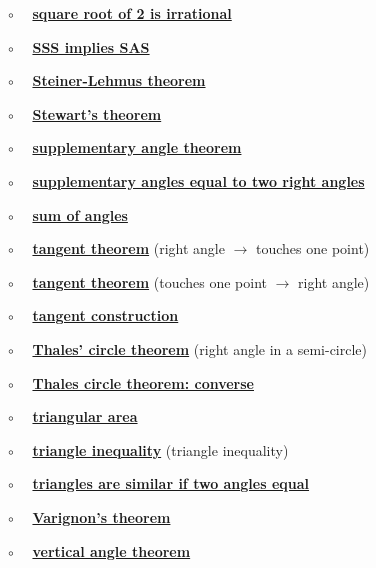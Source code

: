 \documentclass[11pt, oneside]{article}
\begin{document}
$\circ$ \ \ \hyperref[sec:sqrt_two]{\textbf{square root of 2 is irrational}}

$\circ$ \ \ \hyperref[sec:SSS_implies_SAS]{\textbf{SSS implies SAS}}

$\circ$ \ \ \hyperref[sec:Steiner_Lehmus_Theorem]{\textbf{Steiner-Lehmus theorem}}

$\circ$ \ \ \hyperref[sec:Stewarts_theorem]{\textbf{Stewart's theorem}}

$\circ$ \ \ \hyperref[sec:supplementary_angle_theorem]{\textbf{supplementary angle theorem}}

$\circ$ \ \ \hyperref[sec:two_supplementary_equal_two_right]{\textbf{supplementary angles equal to two right angles}}

$\circ$ \ \  \hyperref[sec:triangle_sum_theorem]{\textbf{sum of angles}}

$\circ$ \ \ \hyperref[sec:tangent_one_point]{\textbf{tangent theorem}} (right angle $\rightarrow$ touches one point)

$\circ$ \ \ \hyperref[sec:tangent_perpendicular]{\textbf{tangent theorem}} (touches one point $\rightarrow$ right angle)

$\circ$ \ \ \hyperref[sec:tangent_construction]{\textbf{tangent construction}}

$\circ$ \ \ \hyperref[sec:Thales_theorem]{\textbf{Thales' circle theorem}} (right angle in a semi-circle)

$\circ$ \ \ \hyperref[sec:Thales_circle_theorem_converse]{\textbf{Thales circle theorem:  converse}}

$\circ$ \ \ \hyperref[sec:triangle_area]{\textbf{triangular area}}

$\circ$ \ \ \hyperref[sec:triangle_inequality]{\textbf{triangle inequality}} (triangle inequality)

$\circ$ \ \ \hyperref[sec:two_angles_similar]{\textbf{triangles are similar if two angles equal}}

$\circ$ \ \ \hyperref[sec:Varignon_theorem]{\textbf{Varignon's theorem}}

$\circ$ \ \ \hyperref[sec:vertical_angle_theorem]{\textbf{vertical angle theorem}}
\end{document}
